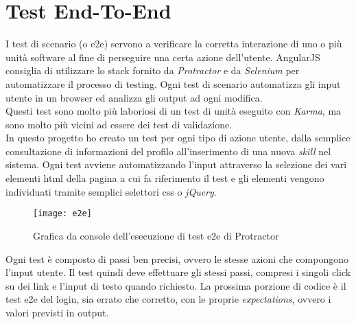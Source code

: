 \section{Test End-To-End}
I test di scenario (o \gls{e2e}) servono a verificare la corretta interazione di uno o più unità software al fine di perseguire una certa azione dell'utente. AngularJS consiglia di utilizzare lo stack fornito da \emph{Protractor} e da \emph{Selenium} per automatizzare il processo di testing. Ogni test di scenario automatizza gli input utente in un browser ed analizza gli output ad ogni modifica.\\
Questi test sono molto più laboriosi di un test di unità eseguito con \emph{Karma}, ma sono molto più vicini ad essere dei test di validazione.\\
In questo progetto ho creato un test per ogni tipo di azione utente, dalla semplice consultazione di informazioni del profilo all'inserimento di una nuova \emph{skill} nel sistema. Ogni test avviene automatizzando l'input attraverso la selezione dei vari elementi \gls{html} della pagina a cui fa riferimento il test e gli elementi vengono individuati tramite semplici selettori \gls{css} o \emph{jQuery}.\\

\begin{figure}[!h] 
    \centering 
    \texttt{[image: e2e]} 
    \caption{Grafica da console dell'esecuzione di test e2e di Protractor}
\end{figure}

Ogni test è composto di passi ben precisi, ovvero le stesse azioni che compongono l'input utente. Il test quindi deve effettuare gli stessi passi, compresi i singoli click su dei link e l'input di testo quando richiesto. La prossima porzione di codice è il test \gls{e2e} del login, sia errato che corretto, con le proprie \emph{expectations}, ovvero i valori previsti in output.

